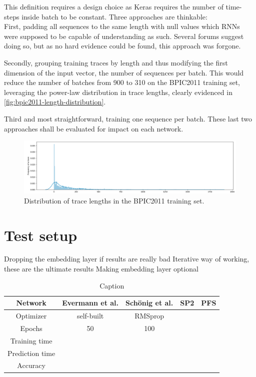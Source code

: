 This definition requires a design choice as Keras requires the number of time-steps inside batch to be constant. Three approaches are thinkable:\\

First, padding all sequences to the same length with null values which RNNs were supposed to be capable of understanding as such. Several forums suggest doing so, but as no hard evidence could be found, this approach was forgone.

Secondly, grouping training traces by length and thus modifying the first dimension of the input vector, the number of sequences per batch. This would reduce the number of batches from 900 to 310 on the BPIC2011 training set, leveraging the power-law distribution in trace lengths, clearly evidenced in \autoref{fig:bpic2011-length-distribution}.

Third and most straightforward, training one sequence per batch. These last two approaches shall be evaluated for impact on each network.

\begin{figure}
    \centering
    \includegraphics[width=\textwidth]{gfx/frequency-distribution.png}
    \caption{Distribution of trace lengths in the BPIC2011 training set.}
    \label{fig:bpic2011-length-distribution}
\end{figure}

\section{Test setup}
Dropping the embedding layer if results are really bad
Iterative way of working, these are the ultimate results
Making embedding layer optional

\begin{table}[]
    \centering
    \begin{tabular}{c|cccc}
        Network & Evermann et al. & Schönig et al. & SP2 & PFS\\
        \hline
        Optimizer & self-built & RMSprop  & \\
        Epochs  & 50    & 100 & \\
        Training time\\
        Prediction time\\
        Accuracy\\
    \end{tabular}
    \caption{Caption}
    \label{tab:my_label}
\end{table}

